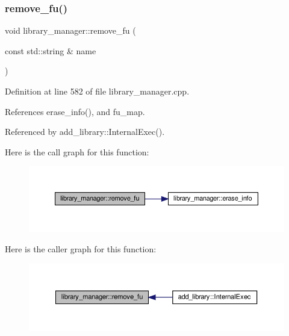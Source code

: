 \subsubsection{\texorpdfstring{remove\+\_\+fu()}{remove\_fu()}}
{\footnotesize\ttfamily void library\+\_\+manager\+::remove\+\_\+fu (\begin{DoxyParamCaption}\item[{const std\+::string \&}]{name }\end{DoxyParamCaption})}



Definition at line 582 of file library\+\_\+manager.\+cpp.



References erase\+\_\+info(), and fu\+\_\+map.



Referenced by add\+\_\+library\+::\+Internal\+Exec().

Here is the call graph for this function\+:
\nopagebreak
\begin{figure}[H]
\begin{center}
\leavevmode
\includegraphics[width=350pt]{d8/d35/classlibrary__manager_a7ae8884cb2871b3cab0ea9b83dcb5829_cgraph}
\end{center}
\end{figure}
Here is the caller graph for this function\+:
\nopagebreak
\begin{figure}[H]
\begin{center}
\leavevmode
\includegraphics[width=350pt]{d8/d35/classlibrary__manager_a7ae8884cb2871b3cab0ea9b83dcb5829_icgraph}
\end{center}
\end{figure}
\mbox{\label{classlibrary__manager_a4e550de1a50f9e84f65c2fdd930f02b8}} 
